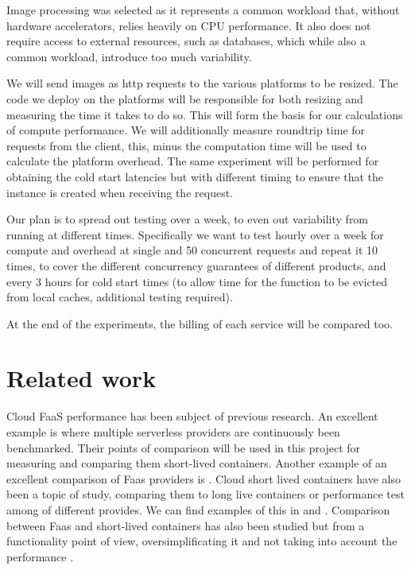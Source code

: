\documentclass[11pt]{article}
\begin{document}
Image processing was selected as it represents a common workload that, without hardware accelerators, relies heavily on CPU performance. It also does not require access to external resources, such as databases, which while also a common workload, introduce too much variability.

We will send images as http requests to the various platforms to be resized. The code we deploy on the platforms will be responsible for both resizing and measuring the time it takes to do so. This will form the basis for our calculations of compute performance. We will additionally measure roundtrip time for requests from the client, this, minus the computation time will be used to calculate the platform overhead.  The same experiment will be performed for obtaining the cold start latencies but with different timing to ensure that the instance is created when receiving the request.

Our plan is to spread out testing over a week, to even out variability from running at different times. Specifically we want to test hourly over a week for compute and overhead at single and 50 concurrent requests and repeat it 10 times, to cover the different concurrency guarantees of different products, and every 3 hours for cold start times (to allow time for the function to be evicted from local caches, additional testing required).

At the end of the experiments, the billing of each service will be compared too.






\section{Related work}
Cloud FaaS performance has been subject of previous research. An excellent example is \cite{aa} where multiple serverless providers are continuously been benchmarked. Their points of comparison will be used in this project for measuring and comparing them short-lived containers. Another example of an excellent comparison of Faas providers is \cite{bb}. Cloud short lived containers have also been a topic of study, comparing them to long live containers or performance test among of different provides. We can find examples of this in \cite{cc} and \cite{dd}. Comparison between Faas and short-lived containers has also been studied but from a functionality point of view, oversimplificating it and not taking into account the performance \cite{ee}\cite{ff}\cite{gg}.
\end{document}
